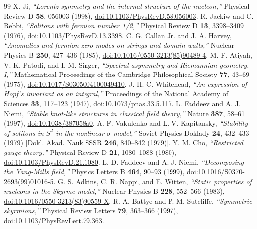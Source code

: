 \documentclass[10pt,aps,prd,twocolumn,superscriptaddress,nofootinbib,floatfix,longbibliography,showkeys]{revtex4-2}
\begin{document}
\begin{thebibliography}{99}
 X. Ji, \textit{``Lorentz symmetry and the internal structure of the nucleon,''} Physical Review D \textbf{58}, 056003 (1998), \href{https://doi.org/10.1103/PhysRevD.58.056003}{doi:10.1103/PhysRevD.58.056003}.
 R. Jackiw and C. Rebbi, \textit{``Solitons with fermion number 1/2,''} Physical Review D \textbf{13}, 3398--3409 (1976), \href{https://doi.org/10.1103/PhysRevD.13.3398}{doi:10.1103/PhysRevD.13.3398}.
 C. G. Callan Jr. and J. A. Harvey, \textit{``Anomalies and fermion zero modes on strings and domain walls,''} Nuclear Physics B \textbf{250}, 427--436 (1985), \href{https://doi.org/10.1016/0550-3213(85)90489-4}{doi:10.1016/0550-3213(85)90489-4}.
 M. F. Atiyah, V. K. Patodi, and I. M. Singer, \textit{``Spectral asymmetry and Riemannian geometry. I,''} Mathematical Proceedings of the Cambridge Philosophical Society \textbf{77}, 43--69 (1975), \href{https://doi.org/10.1017/S0305004100049410}{doi:10.1017/S0305004100049410}.
 J. H. C. Whitehead, \textit{``An expression of Hopf's invariant as an integral,''} Proceedings of the National Academy of Sciences \textbf{33}, 117--123 (1947), \href{https://doi.org/10.1073/pnas.33.5.117}{doi:10.1073/pnas.33.5.117}.
 L. Faddeev and A. J. Niemi, \textit{``Stable knot-like structures in classical field theory,''} Nature \textbf{387}, 58--61 (1997), \href{https://doi.org/10.1038/387058a0}{doi:10.1038/387058a0}.
 A. F. Vakulenko and L. V. Kapitansky, \textit{``Stability of solitons in $S^2$ in the nonlinear $\sigma$-model,''} Soviet Physics Doklady \textbf{24}, 432--433 (1979) [Dokl. Akad. Nauk SSSR \textbf{246}, 840--842 (1979)].
 Y. M. Cho, \textit{``Restricted gauge theory,''} Physical Review D \textbf{21}, 1080--1088 (1980), \href{https://doi.org/10.1103/PhysRevD.21.1080}{doi:10.1103/PhysRevD.21.1080}.
 L. D. Faddeev and A. J. Niemi, \textit{``Decomposing the Yang-Mills field,''} Physics Letters B \textbf{464}, 90--93 (1999), \href{https://doi.org/10.1016/S0370-2693(99)01016-5}{doi:10.1016/S0370-2693(99)01016-5}.
 G. S. Adkins, C. R. Nappi, and E. Witten, \textit{``Static properties of nucleons in the Skyrme model,''} Nuclear Physics B \textbf{228}, 552--566 (1983), \href{https://doi.org/10.1016/0550-3213(83)90559-X}{doi:10.1016/0550-3213(83)90559-X}.
 R. A. Battye and P. M. Sutcliffe, \textit{``Symmetric skyrmions,''} Physical Review Letters \textbf{79}, 363--366 (1997), \href{https://doi.org/10.1103/PhysRevLett.79.363}{doi:10.1103/PhysRevLett.79.363}.

\end{thebibliography}
\end{document}
